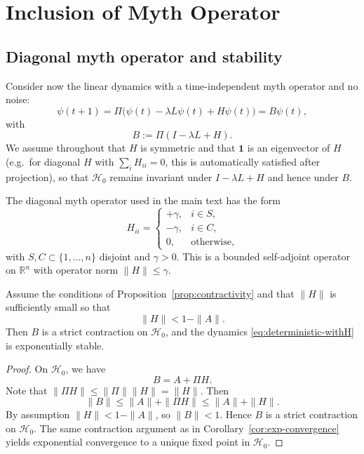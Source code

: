 \documentclass[11pt]{article}
\begin{document}
\section{Inclusion of Myth Operator}

\subsection{Diagonal myth operator and stability}

Consider now the linear dynamics with a time-independent myth operator
and no noise:
\begin{equation}
\psi(t+1) = \Pi\bigl(\psi(t) - \lambda L\psi(t) + H\psi(t)\bigr)
         = B \psi(t),
\label{eq:deterministic-withH}
\end{equation}
with
\[
B := \Pi(I - \lambda L + H).
\]
We assume throughout that \(H\) is symmetric and that \(\mathbf{1}\) is
an eigenvector of \(H\) (e.g.\ for diagonal \(H\) with \(\sum_i H_{ii}=0\),
this is automatically satisfied after projection), so that \(\mathcal{H}_0\)
remains invariant under \(I - \lambda L + H\) and hence under \(B\).

The diagonal myth operator used in the main text has the form
\[
H_{ii} =
\begin{cases}
+\gamma, & i\in S,\\
-\gamma, & i\in C,\\
0, & \text{otherwise},
\end{cases}
\]
with \(S,C\subset\{1,\dots,n\}\) disjoint and \(\gamma>0\). This is a bounded
self-adjoint operator on \(\mathbb{R}^n\) with operator norm
\(\|H\|\le \gamma\).

\begin{proposition}
\label{prop:myth-stability}
Assume the conditions of Proposition~\ref{prop:contractivity} and that
\(\|H\|\) is sufficiently small so that
\[
\|H\| < 1 - \|A\|.
\]
Then \(B\) is a strict contraction on \(\mathcal{H}_0\), and the dynamics
\eqref{eq:deterministic-withH} is exponentially stable.
\end{proposition}

\begin{proof}
On \(\mathcal{H}_0\), we have
\[
B = A + \Pi H.
\]
Note that \(\|\Pi H\| \le \|\Pi\|\|H\| = \|H\|\). Then
\[
\|B\| \le \|A\| + \|\Pi H\| \le \|A\| + \|H\|.
\]
By assumption \(\|H\| < 1 - \|A\|\), so \(\|B\| < 1\). Hence \(B\)
is a strict contraction on \(\mathcal{H}_0\). The same contraction
argument as in Corollary~\ref{cor:exp-convergence} yields exponential
convergence to a unique fixed point in \(\mathcal{H}_0\).
\end{proof}
\end{document}
